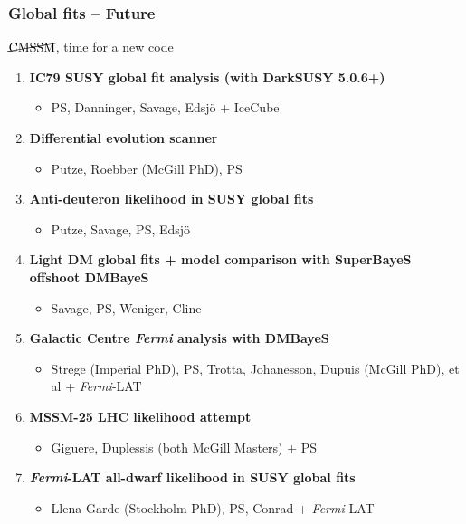 \documentclass[xcolor=dvipsnames]{beamer}
\begin{document}
\begin{frame}
\frametitle{Global fits -- Future}

$\cancel{\mathrm{CMSSM}}$, time for a new code\vspace{5mm}

\begin{enumerate}

\item{\bf IC79 SUSY global fit analysis (with DarkSUSY 5.0.6+)}
\begin{itemize}
\item{\footnotesize PS, Danninger, Savage, Edsj\"o + IceCube}
\end{itemize}

\item{\bf Differential evolution scanner}
\begin{itemize}
\item{\footnotesize Putze, Roebber (McGill PhD), PS}
\end{itemize}

\item{\bf Anti-deuteron likelihood in SUSY global fits}
\begin{itemize}
\item{\footnotesize Putze, Savage, PS, Edsj\"o}
\end{itemize}

\item{\bf Light DM global fits + model comparison with SuperBayeS offshoot DMBayeS}
\begin{itemize}
\item{\footnotesize Savage, PS, Weniger, Cline}
\end{itemize}

\item{\bf Galactic Centre \emph{Fermi} analysis with DMBayeS}
\begin{itemize}
\item{\footnotesize Strege (Imperial PhD), PS, Trotta, Johanesson, Dupuis (McGill PhD), et al + \emph{Fermi}-LAT}
\end{itemize}

\item{\bf MSSM-25 LHC likelihood attempt}
\begin{itemize}
\item{\footnotesize Giguere, Duplessis (both McGill Masters) + PS}
\end{itemize}

\item{\bf\emph{Fermi}-LAT all-dwarf likelihood in SUSY global fits}
\begin{itemize}
\item{\footnotesize Llena-Garde (Stockholm PhD), PS, Conrad + \emph{Fermi}-LAT}
\end{itemize}

\end{enumerate}

\end{frame}
\end{document}
